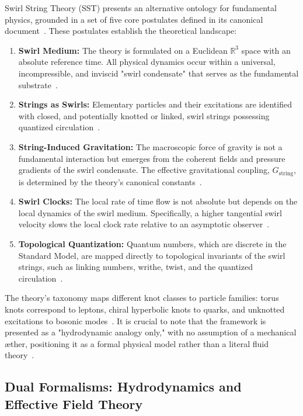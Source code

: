 \documentclass[11pt, a4paper]{article}
\begin{document}
        Swirl String Theory (SST) presents an alternative ontology for fundamental physics, grounded in a set of five core postulates defined in its canonical document~\cite{sst_canon}. These postulates establish the theoretical landscape:
        \begin{enumerate}
        \item \textbf{Swirl Medium:} The theory is formulated on a Euclidean $\mathbb{R}^{3}$ space with an absolute reference time. All physical dynamics occur within a universal, incompressible, and inviscid "swirl condensate" that serves as the fundamental substrate~\cite{sst_canon}.
        \item \textbf{Strings as Swirls:} Elementary particles and their excitations are identified with closed, and potentially knotted or linked, swirl strings possessing quantized circulation~\cite{sst_canon}.
        \item \textbf{String-Induced Gravitation:} The macroscopic force of gravity is not a fundamental interaction but emerges from the coherent fields and pressure gradients of the swirl condensate. The effective gravitational coupling, $G_{\text{string}}$, is determined by the theory's canonical constants~\cite{sst_canon}.
        \item \textbf{Swirl Clocks:} The local rate of time flow is not absolute but depends on the local dynamics of the swirl medium. Specifically, a higher tangential swirl velocity slows the local clock rate relative to an asymptotic observer~\cite{sst_canon}.
        \item \textbf{Topological Quantization:} Quantum numbers, which are discrete in the Standard Model, are mapped directly to topological invariants of the swirl strings, such as linking numbers, writhe, twist, and the quantized circulation~\cite{sst_canon}.
        \end{enumerate}
        The theory's taxonomy maps different knot classes to particle families: torus knots correspond to leptons, chiral hyperbolic knots to quarks, and unknotted excitations to bosonic modes~\cite{sst_canon}. It is crucial to note that the framework is presented as a "hydrodynamic analogy only," with no assumption of a mechanical æther, positioning it as a formal physical model rather than a literal fluid theory~\cite{sst_canon}.

    \subsection{Dual Formalisms: Hydrodynamics and Effective Field Theory}
\end{document}
